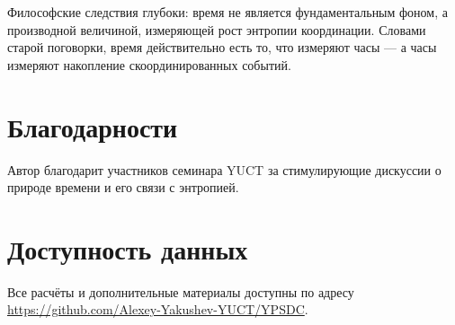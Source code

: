 \documentclass[12pt,a4paper]{article}
\begin{document}
	Философские следствия глубоки: время не является фундаментальным фоном, а производной величиной, измеряющей рост энтропии координации. Словами старой поговорки, время действительно есть то, что измеряют часы — а часы измеряют накопление скоординированных событий.
	
	\section*{Благодарности}
	
	Автор благодарит участников семинара YUCT за стимулирующие дискуссии о природе времени и его связи с энтропией.
	
	\section*{Доступность данных}
	
	Все расчёты и дополнительные материалы доступны по адресу \url{https://github.com/Alexey-Yakushev-YUCT/YPSDC}.
	
\end{document}
